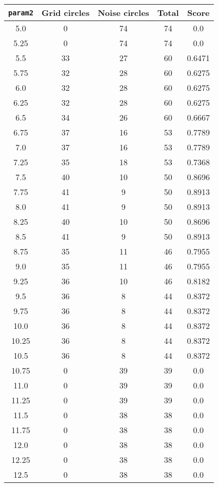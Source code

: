 \documentclass[letterpaper, 12pt]{article}
\begin{document}
\begin{longtable}{|c|c|c|c|c|}
\hline
\textbf{\texttt{param2}} & \textbf{Grid circles} & \textbf{Noise circles} & \textbf{Total} & \textbf{Score} \\
\hline
5.0 & 0 & 74 & 74 & 0.0 \\
\hline
5.25 & 0 & 74 & 74 & 0.0 \\
\hline
5.5 & 33 & 27 & 60 & 0.6471 \\
\hline
5.75 & 32 & 28 & 60 & 0.6275 \\
\hline
6.0 & 32 & 28 & 60 & 0.6275 \\
\hline
6.25 & 32 & 28 & 60 & 0.6275 \\
\hline
6.5 & 34 & 26 & 60 & 0.6667 \\
\hline
6.75 & 37 & 16 & 53 & 0.7789 \\
\hline
7.0 & 37 & 16 & 53 & 0.7789 \\
\hline
7.25 & 35 & 18 & 53 & 0.7368 \\
\hline
7.5 & 40 & 10 & 50 & 0.8696 \\
\hline
7.75 & 41 & 9 & 50 & 0.8913 \\
\hline
8.0 & 41 & 9 & 50 & 0.8913 \\
\hline
8.25 & 40 & 10 & 50 & 0.8696 \\
\hline
8.5 & 41 & 9 & 50 & 0.8913 \\
\hline
8.75 & 35 & 11 & 46 & 0.7955 \\
\hline
9.0 & 35 & 11 & 46 & 0.7955 \\
\hline
9.25 & 36 & 10 & 46 & 0.8182 \\
\hline
9.5 & 36 & 8 & 44 & 0.8372 \\
\hline
9.75 & 36 & 8 & 44 & 0.8372 \\
\hline
10.0 & 36 & 8 & 44 & 0.8372 \\
\hline
10.25 & 36 & 8 & 44 & 0.8372 \\
\hline
10.5 & 36 & 8 & 44 & 0.8372 \\
\hline
10.75 & 0 & 39 & 39 & 0.0 \\
\hline
11.0 & 0 & 39 & 39 & 0.0 \\
\hline
11.25 & 0 & 39 & 39 & 0.0 \\
\hline
11.5 & 0 & 38 & 38 & 0.0 \\
\hline
11.75 & 0 & 38 & 38 & 0.0 \\
\hline
12.0 & 0 & 38 & 38 & 0.0 \\
\hline
12.25 & 0 & 38 & 38 & 0.0 \\
\hline
12.5 & 0 & 38 & 38 & 0.0 \\

\end{longtable}
\end{document}
